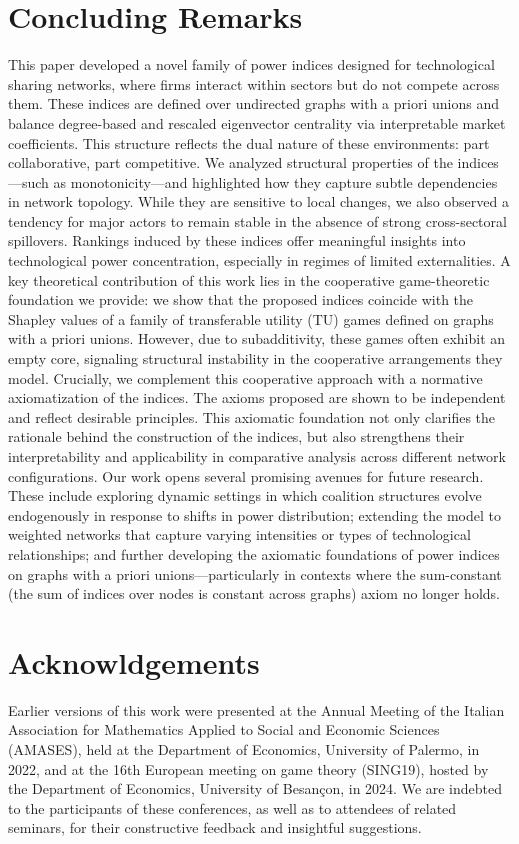 \documentclass[preprint,11pt,authoryear]{elsarticle}
\theoremstyle{plain}
\begin{document}
\section*{Concluding Remarks}
This paper developed a novel family of power indices designed for technological sharing networks, where firms interact  within sectors but do not compete across them. These indices are defined over undirected graphs with a priori unions and balance degree-based and rescaled eigenvector centrality via interpretable market coefficients. This structure reflects the dual nature of these environments: part collaborative, part competitive.
We analyzed structural properties of the indices—such as monotonicity—and highlighted how they capture subtle dependencies in network topology. While they are sensitive to local changes, we also observed a tendency for major actors to remain stable in the absence of strong cross-sectoral spillovers. Rankings induced by these indices offer meaningful insights into technological power concentration, especially in regimes of limited externalities.
A key theoretical contribution of this work lies in the cooperative game-theoretic foundation we provide: we show that the proposed indices coincide with the Shapley values of a family of transferable utility (TU) games defined on graphs with a priori unions. However, due to subadditivity, these games often exhibit an empty core, signaling structural instability in the cooperative arrangements they model.
Crucially, we complement this cooperative approach with a normative axiomatization of the indices. The axioms proposed are shown to be independent and reflect desirable principles. This axiomatic foundation not only clarifies the rationale behind the construction of the indices, but also strengthens their interpretability and applicability in comparative analysis across different network configurations.
Our work opens several promising avenues for future research. These include exploring dynamic settings in which coalition structures evolve endogenously in response to shifts in power distribution; extending the model to weighted networks that capture varying intensities or types of technological relationships; and further developing the axiomatic foundations of power indices on graphs with a priori unions—particularly in contexts where the sum-constant (the sum of indices over nodes is constant across graphs) axiom no longer holds.



\section*{Acknowldgements}
Earlier versions of this work were presented at the Annual Meeting of the Italian Association for Mathematics Applied to Social and Economic Sciences (AMASES), held at the Department of 
Economics, University of Palermo, in 2022, and at the 16th European meeting on game theory (SING19), hosted by the Department of Economics, University of Besançon, in 2024. 
We are indebted to the participants of these conferences, as well as to attendees of related  seminars, for their constructive feedback and insightful suggestions.
\end{document}
